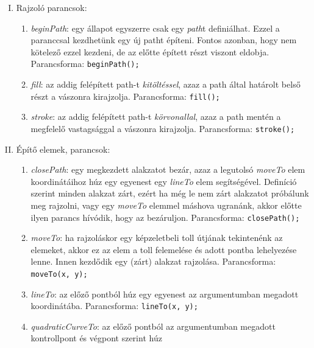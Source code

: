 \documentclass[12pt]{report}
\theoremstyle{definition}
\begin{document}
\begin{enumerate}[I.]
  \item Rajzoló parancsok:
    \begin{enumerate}
      \item \emph{beginPath}: egy állapot egyszerre csak egy
      \emph{path}t definiálhat. Ezzel a paranccsal kezdhetünk egy új
      patht építeni. Fontos azonban, hogy nem kötelező ezzel
      kezdeni, de az előtte épített részt viszont eldobja.
      Parancsforma:\newline
        \texttt{beginPath();}
      \item \emph{fill}: az addig felépített path-t
      \emph{kitöltéssel}, azaz a path által határolt belső részt
      a vászonra kirajzolja. Parancsforma:\newline
        \texttt{fill();}
      \item \emph{stroke}: az addig felépített path-t
      \emph{körvonallal}, azaz a path mentén a megfelelő
      vastagsággal a vászonra kirajzolja. Parancsforma:\newline
        \texttt{stroke();}
    \end{enumerate}
  \item Építő elemek, parancsok:
    \begin{enumerate}
      \item \emph{closePath}: egy megkezdett alakzatot bezár, azaz
      a legutolsó \emph{moveTo} elem koordinátáihoz húz egy
      egyenest egy \emph{lineTo} elem segítségével. Definíció
      szerint minden alakzat zárt, ezért ha még le nem zárt
      alakzatot próbálunk meg rajzolni, vagy egy \emph{moveTo}
      elemmel máshova ugranánk, akkor előtte ilyen parancs
      hívódik, hogy az bezáruljon.
      Parancsforma:\newline
        \texttt{closePath();}
      \item \emph{moveTo}: ha rajzoláskor egy képzeletbeli toll
      útjának tekintenénk az elemeket, akkor ez az elem a toll
      felemelése és adott pontba lehelyezése lenne. Innen kezdődik
      egy (zárt) alakzat rajzolása. Parancsforma:\newline
        \texttt{moveTo(x, y);}
      \item \emph{lineTo}: az előző pontból húz egy egyenest az
      argumentumban megadott koordinátába. Parancsforma:\newline
        \texttt{lineTo(x, y);}
      \item \emph{quadraticCurveTo}: az előző pontból az
      argumentumban megadott kontrollpont és végpont szerint húz

\end{enumerate}
\end{enumerate}
\end{document}

